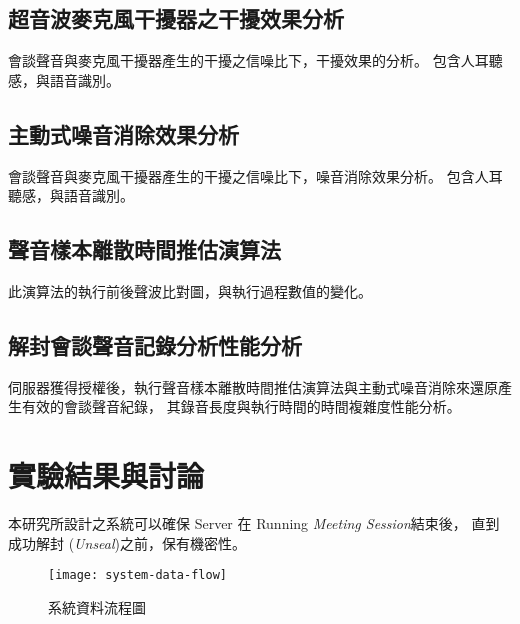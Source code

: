 \subsection{超音波麥克風干擾器之干擾效果分析}

    會談聲音與麥克風干擾器產生的干擾之信噪比下，干擾效果的分析。
包含人耳聽感，與語音識別。


\subsection{主動式噪音消除效果分析}

    會談聲音與麥克風干擾器產生的干擾之信噪比下，噪音消除效果分析。
包含人耳聽感，與語音識別。


\subsection{聲音樣本離散時間推估演算法}

    此演算法的執行前後聲波比對圖，與執行過程數值的變化。


\subsection{解封會談聲音記錄分析性能分析}

    伺服器獲得授權後，執行聲音樣本離散時間推估演算法與主動式噪音消除來還原產生有效的會談聲音紀錄，
其錄音長度與執行時間的時間複雜度性能分析。


\section{實驗結果與討論}

    本研究所設計之系統可以確保 Server 在 Running {\it Meeting Session}結束後，
直到成功解封 ({\it Unseal})之前，\DEFrecREV 保有機密性。

\begin{figure}[H]
    \centering
    \texttt{[image: system-data-flow]}
    \caption{系統資料流程圖}\label{fig:system-data-flow}
\end{figure}